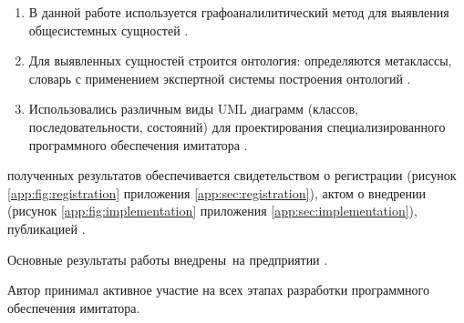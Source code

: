 {\methods}%
\begin{enumerate}
    \item В данной работе используется графоаналилитический метод для выявления общесистемных сущностей \cite{journal:vestnik_igeu:elizarova}.
    \item Для выявленных сущностей строится онтология: определяются метаклассы, словарь с применением экспертной системы построения онтологий \protege.
    \item Использовались различным виды UML диаграмм (классов, последовательности, состояний)
        для проектирования специализированного программного обеспечения имитатора \cite{book:oop:oop_analize}.
\end{enumerate}


{\reliability} полученных результатов обеспечивается
  свидетельством о регистрации (рисунок \ref{app:fig:registration} приложения \ref{app:sec:registration}),
  актом о внедрении (рисунок \ref{app:fig:implementation} приложения \ref{app:sec:implementation}),  
  публикацией \cite{bib:my:ttd_with_patterns_2019}.


{\probation} Основные результаты работы внедрены~на предприятии \leadingOrganizationTitle.

{\contribution} Автор принимал активное участие на всех этапах разработки программного обеспечения имитатора.
